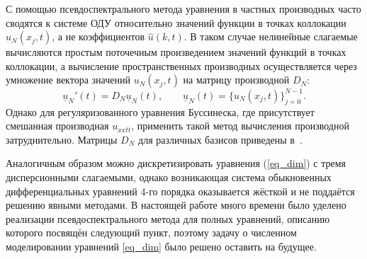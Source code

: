 \documentclass[12pt, a4paper]{report}
\newcommand{\vect}[1]{\underline{#1}}
\begin{document}
С помощью псевдоспектрального метода уравнения в частных производных часто сводятся к системе ОДУ относительно значений функции в точках коллокации $u_N(x_j, t)$, а не коэффициентов $\widehat u(k, t)$. В таком случае нелинейные слагаемые вычисляются простым поточечным произведением значений функций в точках коллокации, а вычисление пространственных производных осуществляется 
через умножение вектора значений $u_N(x_j, t)$ на матрицу производной $D_N$:
\begin{equation}\label{3_phys_deriv}
\vect{u}_N'(t) = D_N \vect{u}_N(t), \qquad \vect{u}_N(t) = \{u_N(x_j, t)\}_{j=0}^{N-1}.
\end{equation}
Однако для регуляризованного уравнения Буссинеска, где присутствует смешанная производная $u_{xxtt}$, применить такой метод вычисления производной затруднительно. Матрицы $D_N$ для различных базисов приведены в~\cite{Canuto2007}.

Аналогичным образом можно дискретизировать уравнения (\ref{eq_dim}) с тремя дисперсионными слагаемыми, однако возникающая система обыкновенных дифференциальных уравнений 4-го порядка оказывается жёсткой и не поддаётся решению явными методами. В настоящей работе много времени было уделено реализации псевдоспектрального метода для полных уравнений, описанию которого посвящён следующий пункт, поэтому задачу о численном моделировании уравнений \eqref{eq_dim} было решено оставить на будущее.
\end{document}
